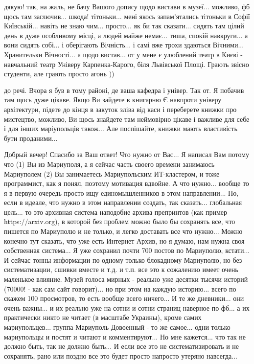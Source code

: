 дякую! так, на жаль, не бачу Вашого допису щодо вистави в музеї... можливо, фб
щось там заглючив... шкода! тітоньки... мені якось запам'ятались тітоньки в
Софії Київській... навіть не знаю чим... просто... як би так сказати... сидять
там цілий день в дуже особливому місці, а людей майже немає... тиша, спокій
навкруги... а вони сидять собі... і оберігають Вічність... і самі вже трохи
здаються Вічними... Хранительки Вічності... а щодо вистав... от у мене є
улюблений театр в Києві - навчальний театр Універу Карпенка-Карого, біля
Львівської Площі. Грають звісно студенти, але грають просто агонь ))

до речі. Вчора я був в тому районі, де ваша кафедра і універ. Так от. Я побачив
там щось дуже цікаве. Якщо Ви зайдете в книгарню Є навпроти універу
архітектури, підете до кінця в закуток зліва від каси і переберете книжки про
мистецтво, можливо, Ви щось знайдете там неймовірно цікаве і важливе для себе і
для інших маріупольців також...  Але поспішайте, книжки мають властивість бути
проданими...

Добрый вечер! Спасибо за Ваш ответ! Что нужно от Вас... Я написал Вам потому
что (1) Вы из Мариуполя, а я сейчас часть своего времени занимаюсь Мариуполем
(2) Вы занимаетесь Мариупольским ИТ-кластером, и тоже программист, как я понял,
поэтому мотивация вдвойне. А что нужно... вообще то я в первую очередь просто
ищу единомышленников в этом направлении...  Но, если в идеале, что нужно в этом
направлении создать, так сказать... глобальная цель... то это архивная система
наподобие архива препринтов (как пример https://arxiv.org), в которой без
проблем можно было бы сохранять все, что пишется по Мариуполю и не только, и
легко доставать все что нужно... Можно конечно тут сказать, что уже есть
Интернет Архив, но я думаю, нам нужна своя собственная система...  Я уже
сохранил почти 700 постов по Мариуполю, кстати... И сейчас тонны информации по
одному только блокадному Мариуполю, но без систематизации, сшивки вместе и т.д.
и т.п. все это к сожалению имеет очень маленькое влияние. Музей голоса мирных -
реально уже десятки тысячи историй (70000! - как сам сайт говорит)... но при этом на каждую историю... всего по скажем
100 просмотров, то есть вообще всего ничего... И те же дневники... они очень важны... и их реально уже на
сотни и сотни страниц наверное по фб... а их практически никто не читает (в
масштабе Украины), кроме самих мариупольцев... группа Мариуполь Довоенный - то
же самое... одни только мариупольцы и постят и читают и комментируют... Но мне
кажется... что так не должно быть, так не должно быть... И если все это не
систематизировать и не сохранять, рано или поздно все это будет просто напросто
утеряно навсегда...

